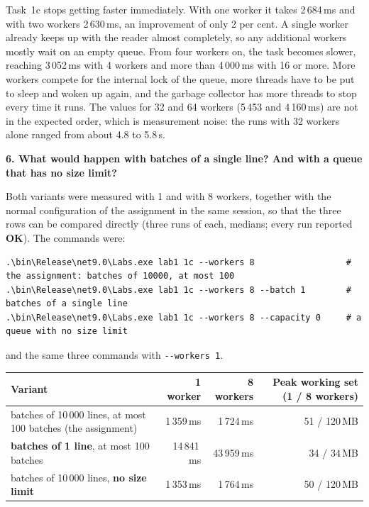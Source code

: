 \documentclass[11pt,a4paper]{article}
\newcommand{\OK}{\textbf{OK}}
\newcommand{\question}[1]{\par\medskip\textbf{#1}\par}
\begin{document}
Task~1c stops getting faster immediately. With one worker it takes 2\,684\,ms and with two workers
2\,630\,ms, an improvement of only 2 per cent. A single worker already keeps up with the reader almost
completely, so any additional workers mostly wait on an empty queue. From four workers on, the task
becomes slower, reaching 3\,052\,ms with 4 workers and more than 4\,000\,ms with 16 or more. More
workers compete for the internal lock of the queue, more threads have to be put to sleep and woken up
again, and the garbage collector has more threads to stop every time it runs. The values for 32 and
64 workers (5\,453 and 4\,160\,ms) are not in the expected order, which is measurement noise: the
runs with 32 workers alone ranged from about 4.8 to 5.8\,s.

\question{6. What would happen with batches of a single line? And with a queue that has no size
limit?}

Both variants were measured with 1 and with 8 workers, together with the normal configuration of the
assignment in the same session, so that the three rows can be compared directly (three runs of each,
medians; every run reported \OK). The commands were:

\begin{lstlisting}
.\bin\Release\net9.0\Labs.exe lab1 1c --workers 8                  # the assignment: batches of 10000, at most 100
.\bin\Release\net9.0\Labs.exe lab1 1c --workers 8 --batch 1        # batches of a single line
.\bin\Release\net9.0\Labs.exe lab1 1c --workers 8 --capacity 0     # a queue with no size limit
\end{lstlisting}

and the same three commands with \texttt{-{}-workers 1}.

\begin{center}
\small
\begin{tabularx}{\linewidth}{@{}Xrrr@{}}
\toprule
Variant & 1 worker & 8 workers & Peak working set (1 / 8 workers) \\
\midrule
batches of 10\,000 lines, at most 100 batches (the assignment) & 1\,359\,ms & 1\,724\,ms & 51 / 120\,MB \\
\textbf{batches of 1 line}, at most 100 batches & 14\,841\,ms & 43\,959\,ms & 34 / 34\,MB \\
batches of 10\,000 lines, \textbf{no size limit} & 1\,353\,ms & 1\,764\,ms & 50 / 120\,MB \\
\bottomrule
\end{tabularx}
\end{center}
\end{document}

